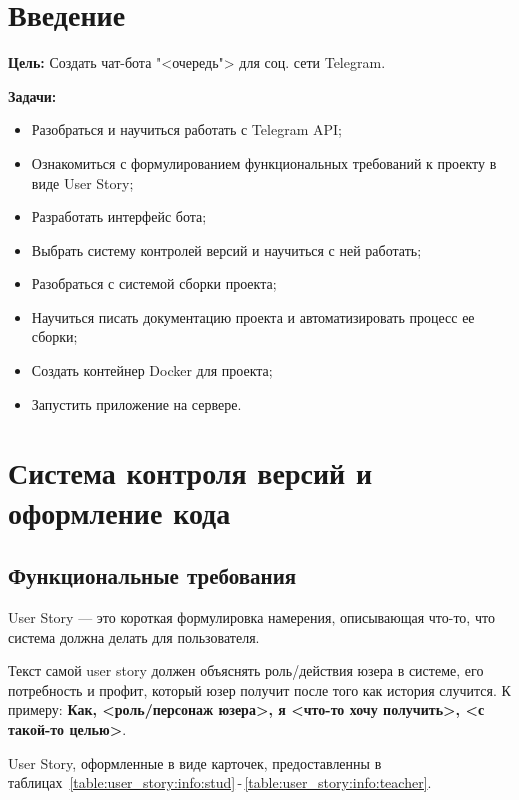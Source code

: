 \graphicspath{{./img/}} %

\chapter*{Введение}
\textbf{Цель:} Создать чат-бота "<очередь"> для соц. сети Telegram.

\textbf{Задачи:}
\begin{itemize}
	\item Разобраться и научиться работать с Telegram API;
	\item Ознакомиться с формулированием функциональных требований к проекту
		в виде User Story;
	\item Разработать интерфейс бота;
	\item Выбрать систему контролей версий и научиться с ней работать;
	\item Разобраться с системой сборки проекта;
	\item Научиться писать документацию проекта и
		автоматизировать процесс ее сборки;
	\item Создать контейнер Docker для проекта;
	\item Запустить приложение на сервере.
\end{itemize}

\chapter{Система контроля версий и оформление кода}
\section{Функциональные требования}
User Story --- это короткая формулировка намерения, описывающая что-то,
что система должна делать для пользователя.\par
Текст самой user story должен объяснять роль/действия юзера в системе,
его потребность и профит, который юзер получит после того как история
случится. К примеру: \textbf{Как, <роль/персонаж юзера>, я <что-то хочу
получить>, <с такой-то целью>}.

User Story, оформленные в виде карточек, предоставленны в
таблицах~\ref{table:user_story:info:stud}\,-\,\ref{table:user_story:info:teacher}.

